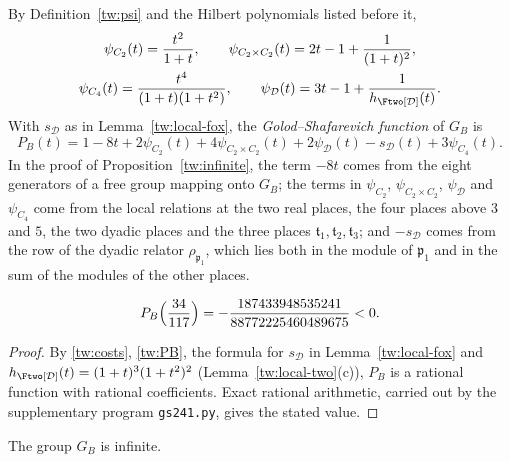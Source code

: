 By Definition~\ref{tw:psi} and the Hilbert polynomials listed before it,
\begin{equation}\label{tw:costs}
\begin{gathered}
 \psi_{C_2}(t)=\frac{t^2}{1+t},\qquad
 \psi_{C_2\times C_2}(t)=2t-1+\frac1{(1+t)^2},\\
 \psi_{C_4}(t)=\frac{t^4}{(1+t)(1+t^2)},\qquad
 \psi_{\mathcal D}(t)=3t-1+\frac1{h_{\Ftwo[\mathcal D]}(t)}.
\end{gathered}
\end{equation}
With $s_{\mathcal D}$ as in Lemma~\ref{tw:local-fox}, the \emph{Golod--Shafarevich
function} of $G_B$ is
\begin{equation}\label{tw:PB}
 P_B(t)=1-8t+2\psi_{C_2}(t)+4\psi_{C_2\times C_2}(t)+2\psi_{\mathcal D}(t)-s_{\mathcal D}(t)
 +3\psi_{C_4}(t).
\end{equation}
In the proof of Proposition~\ref{tw:infinite}, the term $-8t$ comes from the
eight generators of a free group mapping onto $G_B$; the terms in
$\psi_{C_2}$, $\psi_{C_2\times C_2}$, $\psi_{\mathcal D}$ and $\psi_{C_4}$ come from the
local relations at the two real places, the four places above $3$ and $5$,
the two dyadic places and the three places
$\mathfrak t_1,\mathfrak t_2,\mathfrak t_3$; and $-s_{\mathcal D}$ comes from the row of
the dyadic relator $\rho_{\mathfrak p_1}$, which lies both in the module of
$\mathfrak p_1$ and in the sum of the modules of the other places.

\begin{lemma}\label{tw:PB-value}
\[
 P_B\Bigl(\frac{34}{117}\Bigr)=-\frac{187433948535241}{88772225460489675}<0.
\]
\end{lemma}

\begin{proof}
By \eqref{tw:costs}, \eqref{tw:PB}, the formula for $s_{\mathcal D}$ in
Lemma~\ref{tw:local-fox} and $h_{\Ftwo[\mathcal D]}(t)=(1+t)^3(1+t^2)^2$
(Lemma~\ref{tw:local-two}(c)), $P_B$ is a rational function with rational
coefficients. Exact rational arithmetic, carried out by the supplementary
program \texttt{gs241.py}, gives the stated value.
\end{proof}

\begin{proposition}\label{tw:infinite}
The group $G_B$ is infinite.
\end{proposition}

